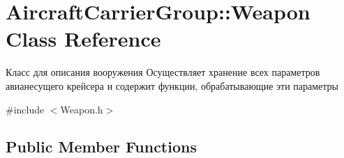 \hypertarget{class_aircraft_carrier_group_1_1_weapon}{}\section{Aircraft\+Carrier\+Group\+:\+:Weapon Class Reference}
\label{class_aircraft_carrier_group_1_1_weapon}


Класс для описания вооружения  Осуществляет хранение всех параметров авианесущего крейсера и содержит функции, обрабатывающие эти параметры  




{\ttfamily \#include $<$Weapon.\+h$>$}

\subsection*{Public Member Functions}
